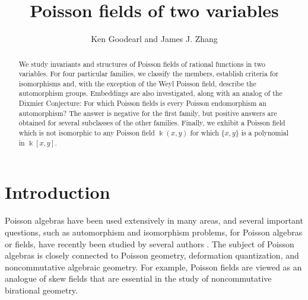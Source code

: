 \documentclass[12pt]{amsart}
\theoremstyle{plain}
\numberwithin{theorem}{section}
\numberwithin{equation}{theorem}
\theoremstyle{definition}
\begin{document}
\title{Poisson fields of two variables}

\author{Ken Goodearl and James J. Zhang}

\address{Goodearl: Department of Mathematics, 
University of California, Santa Barbara, California, USA}


\address{Zhang: Department of Mathematics, Box 354350,
University of Washington, Seattle, Washington 98195, USA}



\begin{abstract}
We study invariants and structures of 
Poisson fields of rational functions in 
two variables. For four particular families, 
we classify the members, establish criteria 
for isomorphisms and, with the exception 
of the Weyl Poisson field, describe the 
automorphism groups. Embeddings are also 
investigated, along with an analog of the 
Dixmier Conjecture: For which Poisson 
fields is every Poisson endomorphism an 
automorphism? The answer is negative for 
the first family, but positive answers are 
obtained for several subclasses of the 
other families. Finally, we exhibit a 
Poisson field which is not isomorphic to 
any Poisson field $\Bbbk(x,y)$ for which 
$\{x,y\}$ is a polynomial in $\Bbbk[x,y]$.
\end{abstract}





\maketitle

\section*{Introduction}
\label{zzsec0}

Poisson algebras have been used extensively 
in many areas, and several important 
questions, such as automorphism and 
isomorphism problems, for Poisson algebras 
or fields, have recently been studied by 
several authors \cite{Bl, MLU, HTWZ1, HTWZ2}. 
The subject of Poisson algebras is closely 
connected to Poisson geometry, deformation 
quantization, and noncommutative algebraic 
geometry. For example, Poisson fields are 
viewed as an analogue of skew fields that 
are essential in the study of noncommutative 
birational geometry. 
\end{document}

